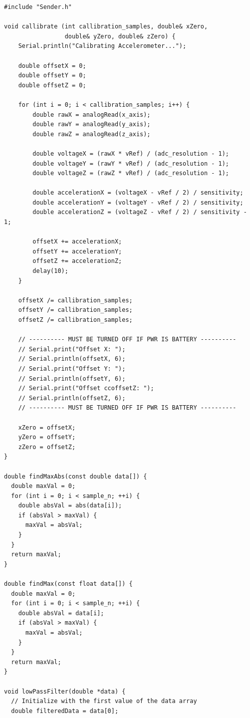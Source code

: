 \begin{verbatim}
#include "Sender.h"

void callibrate (int callibration_samples, double& xZero,
                 double& yZero, double& zZero) {
    Serial.println("Calibrating Accelerometer...");

    double offsetX = 0;
    double offsetY = 0;
    double offsetZ = 0;

    for (int i = 0; i < callibration_samples; i++) {
        double rawX = analogRead(x_axis);
        double rawY = analogRead(y_axis);
        double rawZ = analogRead(z_axis);

        double voltageX = (rawX * vRef) / (adc_resolution - 1);
        double voltageY = (rawY * vRef) / (adc_resolution - 1);
        double voltageZ = (rawZ * vRef) / (adc_resolution - 1);

        double accelerationX = (voltageX - vRef / 2) / sensitivity;
        double accelerationY = (voltageY - vRef / 2) / sensitivity;
        double accelerationZ = (voltageZ - vRef / 2) / sensitivity - 1;

        offsetX += accelerationX;
        offsetY += accelerationY;
        offsetZ += accelerationZ;
        delay(10);
    }

    offsetX /= callibration_samples;
    offsetY /= callibration_samples;
    offsetZ /= callibration_samples;

    // ---------- MUST BE TURNED OFF IF PWR IS BATTERY ----------
    // Serial.print("Offset X: ");
    // Serial.println(offsetX, 6);
    // Serial.print("Offset Y: ");
    // Serial.println(offsetY, 6);
    // Serial.print("Offset ccoffsetZ: ");
    // Serial.println(offsetZ, 6);
    // ---------- MUST BE TURNED OFF IF PWR IS BATTERY ----------

    xZero = offsetX;
    yZero = offsetY;
    zZero = offsetZ;
}

double findMaxAbs(const double data[]) {
  double maxVal = 0;
  for (int i = 0; i < sample_n; ++i) {
    double absVal = abs(data[i]);
    if (absVal > maxVal) {
      maxVal = absVal;
    }
  }
  return maxVal;
}

double findMax(const float data[]) {
  double maxVal = 0;
  for (int i = 0; i < sample_n; ++i) {
    double absVal = data[i];
    if (absVal > maxVal) {
      maxVal = absVal;
    }
  }
  return maxVal;
}

void lowPassFilter(double *data) {
  // Initialize with the first value of the data array
  double filteredData = data[0];


\end{verbatim}
